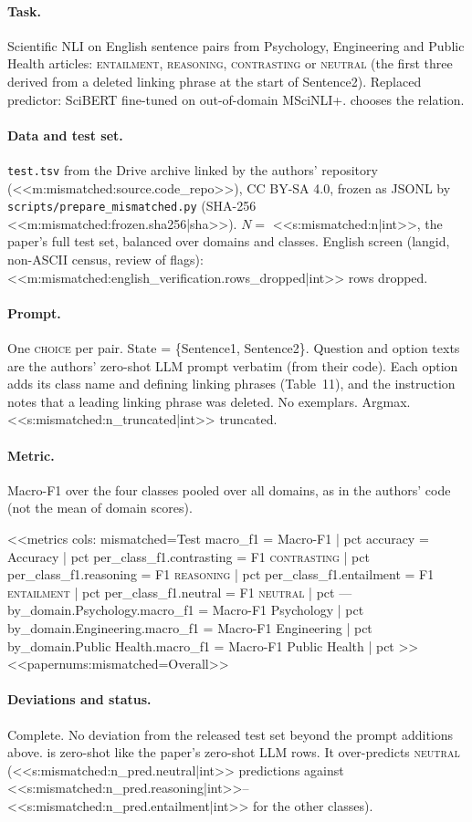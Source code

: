 \paragraph{Task.} Scientific NLI on English sentence pairs from Psychology, Engineering and Public Health articles:
\textsc{entailment}, \textsc{reasoning}, \textsc{contrasting} or \textsc{neutral} (the first three derived from a
deleted linking phrase at the start of Sentence2). Replaced predictor: SciBERT fine-tuned on out-of-domain MSciNLI+.
\jev{} chooses the relation.

\paragraph{Data and test set.} \texttt{test.tsv} from the Drive archive linked by the authors' repository
(<<m:mismatched:source.code_repo>>), CC BY-SA 4.0, frozen as JSONL by \texttt{scripts/\allowbreak{}prepare\_mismatched.py} (SHA-256 <<m:mismatched:frozen.sha256|sha>>).
$N=$ <<s:mismatched:n|int>>, the paper's full test set, balanced over domains and classes. English screen (langid,
non-ASCII census, review of flags): <<m:mismatched:english_verification.rows_dropped|int>> rows dropped.

\paragraph{Prompt.} One \textsc{choice} per pair. State = \{Sentence1, Sentence2\}. Question and option texts are the
authors' zero-shot LLM prompt verbatim (from their code). Each option adds its class name and defining linking
phrases (Table~11), and the instruction notes that a leading linking phrase was deleted. No exemplars. Argmax.
<<s:mismatched:n_truncated|int>> truncated.

\paragraph{Metric.} Macro-F1 over the four classes pooled over all domains, as in the authors' code (not the mean
of domain scores).

<<metrics
cols: mismatched=Test
macro_f1 = Macro-F1 | pct
accuracy = Accuracy | pct
per_class_f1.contrasting = F1 \textsc{contrasting} | pct
per_class_f1.reasoning = F1 \textsc{reasoning} | pct
per_class_f1.entailment = F1 \textsc{entailment} | pct
per_class_f1.neutral = F1 \textsc{neutral} | pct
---
by_domain.Psychology.macro_f1 = Macro-F1 Psychology | pct
by_domain.Engineering.macro_f1 = Macro-F1 Engineering | pct
by_domain.Public Health.macro_f1 = Macro-F1 Public Health | pct
>>
<<papernums:mismatched=Overall>>

\paragraph{Deviations and status.} Complete. No deviation from the released test set beyond the prompt additions
above. \jev{} is zero-shot like the paper's zero-shot LLM rows. It over-predicts \textsc{neutral}
(<<s:mismatched:n_pred.neutral|int>> predictions against <<s:mismatched:n_pred.reasoning|int>>--<<s:mismatched:n_pred.entailment|int>>
for the other classes).
